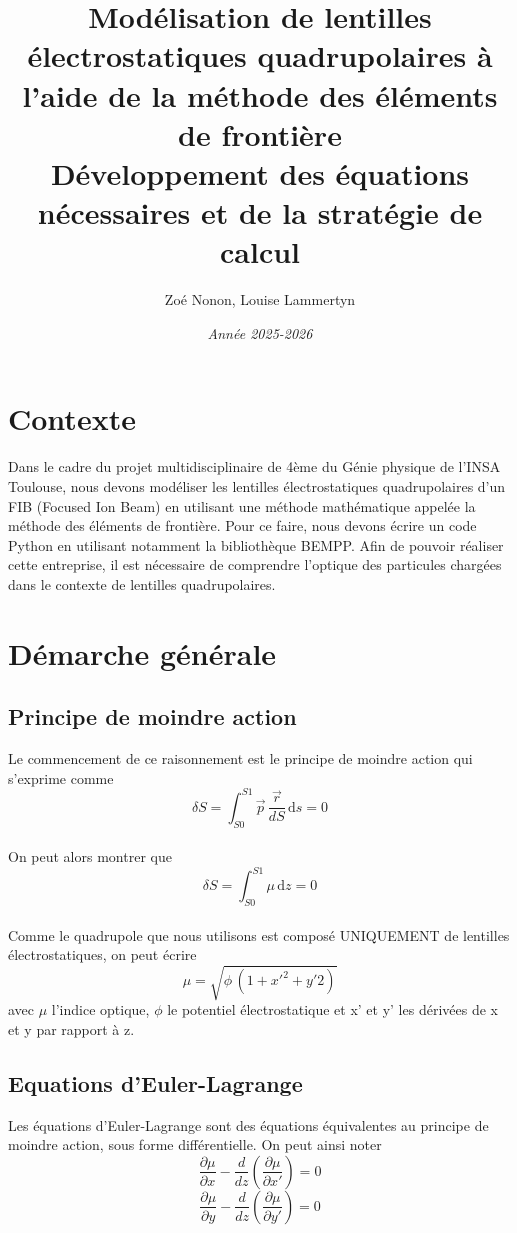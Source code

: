 \documentclass{article}
\title{\textbf{\LARGE Modélisation de lentilles électrostatiques quadrupolaires à l'aide de la méthode des éléments de frontière}
\\[0.5em]\LARGE Développement des équations nécessaires et de la stratégie de calcul}
\author{Zoé Nonon, Louise Lammertyn}
\date{\textit{Année 2025-2026}}
\begin{document}
\maketitle
\section{Contexte}
Dans le cadre du projet multidisciplinaire de 4ème du Génie physique de l'INSA Toulouse, nous devons modéliser les lentilles électrostatiques quadrupolaires 
d'un FIB (Focused Ion Beam) en utilisant une méthode mathématique appelée la méthode des éléments de frontière. Pour ce faire, nous devons écrire un code Python 
en utilisant notamment la bibliothèque BEMPP. Afin de pouvoir réaliser cette entreprise, il est nécessaire de comprendre l'optique des particules chargées dans le contexte
de lentilles quadrupolaires. 

\section{Démarche générale}
\subsection{Principe de moindre action}
Le commencement de ce raisonnement est le principe de moindre action qui s'exprime comme 
\[
\delta S = \int_{S0}^{S1} \vec{p}\,\frac{\vec{r}}{dS} \, \mathrm{d}s = 0
\]
\\
On peut alors montrer que 
\[
\delta S = \int_{S0}^{S1} \mu\,\mathrm{d}z = 0
\]
\\
Comme le quadrupole que nous utilisons est composé UNIQUEMENT de lentilles électrostatiques, on peut écrire
\[
\mu = \sqrt{\phi \, (1+x'^2+y'2)}
\]
avec $\mu$ l'indice optique, $\phi$ le potentiel électrostatique et x' et y' les dérivées de x et y par
rapport à z.

\subsection{Equations d'Euler-Lagrange}
Les équations d'Euler-Lagrange sont des équations équivalentes au principe de moindre action, sous forme 
différentielle. On peut ainsi noter 
\[
\frac{\partial \mu }{\partial x}-\frac{d}{dz}\left(\frac{\partial \mu }{\partial x'}\right)=0
\]
\[
\frac{\partial \mu }{\partial y}-\frac{d}{dz}\left(\frac{\partial \mu }{\partial y'}\right)=0
\]
\end{document}
